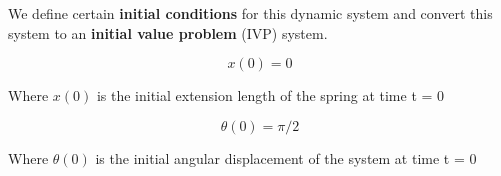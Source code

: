 {We define certain \textbf{initial conditions} for this dynamic system and convert this system to an \textbf{initial value problem} (IVP) system.}
        
    $$x(0) = 0$$
        
    {Where $x(0)$ is the initial extension length of the spring at time t = 0}
        
    $$\theta(0) = \pi/2$$
        
    {Where $\theta(0)$ is the initial angular displacement of the system at time t = 0}
        
        

